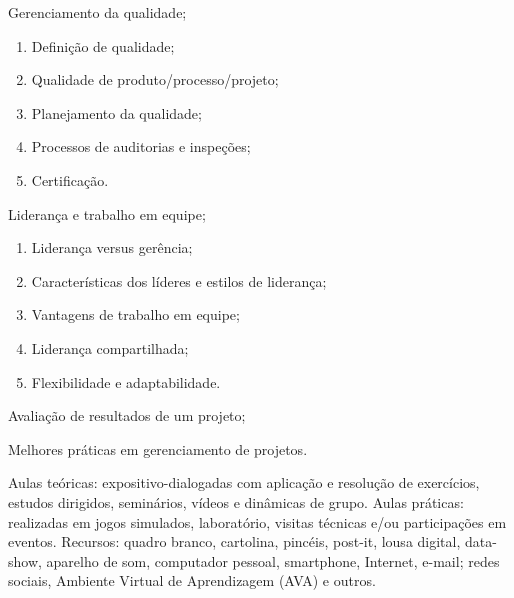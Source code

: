 \begin{pud}
\begin{description}[itemsep=0em]
        \item[UNIDADE IV:] Gerenciamento da qualidade;
		\begin{enumerate}[itemsep=0em, topsep=0em]
			\item Definição de qualidade;
			\item Qualidade de produto/processo/projeto;
			\item Planejamento da qualidade;
			\item Processos de auditorias e inspeções;
			\item Certificação.
		\end{enumerate}
		
		\item[UNIDADE V:] Liderança e trabalho em equipe;
		\begin{enumerate}[itemsep=0em, topsep=0em]
			\item  Liderança versus gerência;
			\item  Características dos líderes e estilos de liderança;
			\item  Vantagens de trabalho em equipe;
			\item  Liderança compartilhada;
			\item  Flexibilidade e adaptabilidade.
		\end{enumerate}
		
		\item[UNIDADE VI:]  Avaliação de resultados de um projeto;
				
		\item[UNIDADE VII:]  Melhores práticas em gerenciamento de projetos.
		
	\end{description}
	
	\metodologia
	Aulas teóricas: expositivo-dialogadas com aplicação e resolução de exercícios, estudos dirigidos, seminários, vídeos e dinâmicas de grupo. Aulas práticas: realizadas em jogos simulados, laboratório, visitas técnicas e/ou participações em eventos. Recursos: quadro branco, cartolina, pincéis, post-it, lousa digital, data-show, aparelho de som, computador pessoal, smartphone, Internet, e-mail; redes sociais, Ambiente Virtual de Aprendizagem (AVA) e outros.
	

\end{pud}
